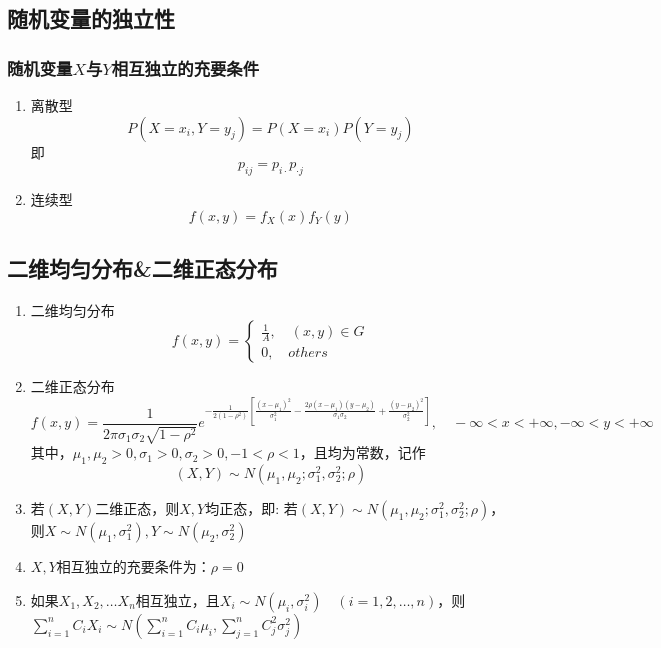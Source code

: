 \subsection{随机变量的独立性}
\subsubsection{随机变量$X$与$Y$相互独立的充要条件}
\begin{enumerate}
	\item 离散型
	\begin{equation}
		P(X=x_i, Y=y_j) = P(X=x_i)P(Y=y_j)
	\end{equation}
	即
	\begin{equation}
		p_{ij} = p_{i\cdot} p_{\cdot j}
	\end{equation}

	\item 连续型
	\begin{equation}
		f(x, y) = f_X(x)f_Y(y)
	\end{equation}
	
\end{enumerate}


\subsection{二维均匀分布\&二维正态分布}
\begin{enumerate}
	\item 二维均匀分布
		\[ f(x, y)=\begin{cases}
			\frac{1}{A}, \quad (x, y) \in G \\
			0, \quad others
		\end{cases} \]

	\item 二维正态分布
	\begin{equation}
		f(x,y) = \frac{1}{2\pi \sigma_1 \sigma_2 \sqrt{1-\rho^2}}e^{-\frac{1}{2(1-\rho^2)}\left[ \frac{(x-\mu_1)^2}{\sigma_1^2} - \frac{2\rho(x-\mu_1)(y-\mu_2)}{\sigma_1 \sigma_2} + \frac{(y-\mu_2)^2}{\sigma_2^2} \right]}, \quad -\infty<x<+\infty, -\infty<y<+\infty
	\end{equation}
	其中，$\mu_1, \mu_2 > 0, \sigma_1>0, \sigma_2 > 0, -1<\rho < 1$，且均为常数，记作
	\begin{equation}
		(X,Y) \sim N(\mu_1, \mu_2; \sigma_1^2, \sigma_2^2; \rho)
	\end{equation}

	\item 若$(X,Y)$二维正态，则$X, Y$均正态，即: 若$(X, Y) \sim N(\mu_1, \mu_2; \sigma_1^2, \sigma_2^2; \rho)$，则$X \sim N(\mu_1, \sigma_1^2), Y \sim N(\mu_2, \sigma_2^2)$
	
	\item $X, Y$相互独立的充要条件为：$\rho = 0$

	\item 如果$X_1, X_2, \dots X_n$相互独立，且$X_i \sim N(\mu_i, \sigma_i^2) \quad (i = 1, 2, \dots, n)$，则$\sum_{i=1}^{n}C_iX_i \sim N(\sum_{i=1}^{n}C_i\mu_i, \sum_{j=1}^{n}C_j^2\sigma_j^2)$
\end{enumerate}



